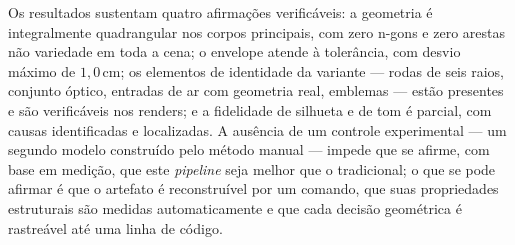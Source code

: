 Os resultados sustentam quatro afirma\c{c}\~oes verific\'aveis: a geometria \'e
integralmente quadrangular nos corpos principais, com zero n-gons e zero arestas n\~ao
variedade em toda a cena; o envelope atende \`a toler\^ancia, com desvio m\'aximo de
$1{,}0$\,cm; os elementos de identidade da variante --- rodas de seis raios, conjunto
\'optico, entradas de ar com geometria real, emblemas --- est\~ao presentes e s\~ao
verific\'aveis nos renders; e a fidelidade de silhueta e de tom \'e parcial, com causas
identificadas e localizadas. A aus\^encia de um controle experimental --- um segundo
modelo constru\'ido pelo m\'etodo manual --- impede que se afirme, com base em
medi\c{c}\~ao, que este \emph{pipeline} seja melhor que o tradicional; o que se pode
afirmar \'e que o artefato \'e reconstru\'ivel por um comando, que suas propriedades
estruturais s\~ao medidas automaticamente e que cada decis\~ao geom\'etrica \'e
rastre\'avel at\'e uma linha de c\'odigo.
